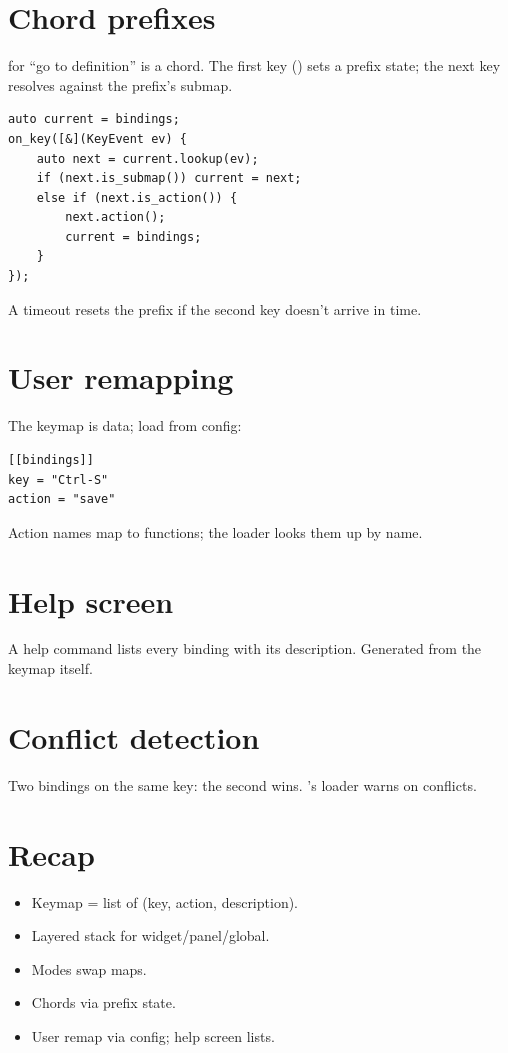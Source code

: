 \section{Chord prefixes}

 for ``go to definition'' is a chord. The first
key () sets a prefix state; the next key resolves
against the prefix's submap.

\begin{lstlisting}
auto current = bindings;
on_key([&](KeyEvent ev) {
    auto next = current.lookup(ev);
    if (next.is_submap()) current = next;
    else if (next.is_action()) {
        next.action();
        current = bindings;
    }
});
\end{lstlisting}

A timeout resets the prefix if the second key doesn't
arrive in time.

\section{User remapping}

The keymap is data; load from config:

\begin{lstlisting}
[[bindings]]
key = "Ctrl-S"
action = "save"
\end{lstlisting}

Action names map to functions; the loader looks them up by
name.

\section{Help screen}

A help command lists every binding with its description.
Generated from the keymap itself.

\section{Conflict detection}

Two bindings on the same key: the second wins. \maya{}'s
loader warns on conflicts.

\section{Recap}

\begin{recap}
\begin{itemize}[leftmargin=*]
  \item Keymap = list of (key, action, description).
  \item Layered stack for widget/panel/global.
  \item Modes swap maps.
  \item Chords via prefix state.
  \item User remap via config; help screen lists.
\end{itemize}
\end{recap}

